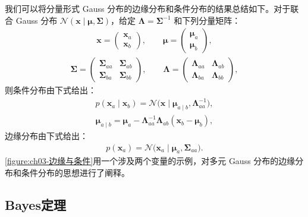 \documentclass[../../main.tex]{subfiles}
\begin{document}
我们可以将分量形式 Gauss 分布的边缘分布和条件分布的结果总结如下。对于联合 Gauss 分布 $\mathcal{N}(\boldsymbol{x}\mid\boldsymbol{\mu},\boldsymbol{\Sigma})$，给定 $\boldsymbol{\Lambda}=\boldsymbol{\Sigma}^{-1}$ 和下列分量矩阵：
\begin{align}
\boldsymbol{x}=\begin{pmatrix}\boldsymbol{x}_{a}\\ \boldsymbol{x}_{b}\end{pmatrix},\qquad
\boldsymbol{\mu}=\begin{pmatrix}\boldsymbol{\mu}_{a}\\ \boldsymbol{\mu}_{b}\end{pmatrix},
\label{align:ch03-分量定义}
\end{align}
\begin{align}
\boldsymbol{\Sigma}=\begin{pmatrix}\boldsymbol{\Sigma}_{aa} & \boldsymbol{\Sigma}_{ab}\\ \boldsymbol{\Sigma}_{ba} & \boldsymbol{\Sigma}_{bb}\end{pmatrix},\qquad
\boldsymbol{\Lambda}=\begin{pmatrix}\boldsymbol{\Lambda}_{aa} & \boldsymbol{\Lambda}_{ab}\\ \boldsymbol{\Lambda}_{ba} & \boldsymbol{\Lambda}_{bb}\end{pmatrix},
\label{align:ch03-分量矩阵}
\end{align}
则条件分布由下式给出：
\begin{align}
p(\boldsymbol{x}_{a}\mid\boldsymbol{x}_{b})=\mathcal{N}\bigl(\boldsymbol{x}\mid\boldsymbol{\mu}_{a\mid b},\boldsymbol{\Lambda}_{aa}^{-1}\bigr),
\label{align:ch03-条件分布总结}
\end{align}
\begin{align}
\boldsymbol{\mu}_{a\mid b}=\boldsymbol{\mu}_{a}-\boldsymbol{\Lambda}_{aa}^{-1}\boldsymbol{\Lambda}_{ab}(\boldsymbol{x}_{b}-\boldsymbol{\mu}_{b}),
\label{align:ch03-条件均值总结}
\end{align}
边缘分布由下式给出：
\begin{align}
p(\boldsymbol{x}_{a})=\mathcal{N}\bigl(\boldsymbol{x}_{a}\mid\boldsymbol{\mu}_{a},\boldsymbol{\Sigma}_{aa}\bigr).
\label{align:ch03-边缘分布总结}
\end{align}
\cref{figure:ch03-边缘与条件}用一个涉及两个变量的示例，对多元 Gauss 分布的边缘分布和条件分布的思想进行了阐释。

\subsection{Bayes定理}\label{subsection:ch03-Bayes定理}
\end{document}
